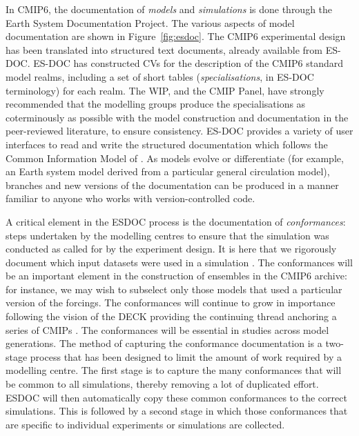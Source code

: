 \documentclass[gmd,manuscript]{copernicus}
\newcommand{\bibref}[1] { \cite{ref:#1}}
\newcommand{\figref}[1] {\mbox{Figure   \ref{fig:#1}}}
\begin{document}
In CMIP6, the documentation of \emph{models} and \emph{simulations} is
done through the Earth System Documentation
\citep[\href{https://goo.gl/WNwKD9}{ES-DOC},][]{ref:guilyardietal2013}
Project. The various aspects of model documentation are shown in
\figref{esdoc}. The CMIP6 experimental design has been translated into
structured text documents, already available from ES-DOC. ES-DOC has
constructed CVs for the description of the CMIP6 standard model
realms, including a set of short tables (\emph{specialisations}, in
ES-DOC terminology) for each realm. The WIP, and the CMIP Panel, have
strongly recommended that the modelling groups produce the
specialisations as coterminously as possible with the model
construction and documentation in the peer-reviewed literature, to
ensure consistency. ES-DOC provides a variety of user interfaces to
read and write the structured documentation which follows the Common
Information Model of \bibref{lawrenceetal2012}. As models evolve or
differentiate (for example, an Earth system model derived from a
particular general circulation model), branches and new versions of
the documentation can be produced in a manner familiar to anyone who
works with version-controlled code.

A critical element in the ESDOC process is the documentation of
\emph{conformances}: steps undertaken by the modelling centres to
ensure that the simulation was conducted as called for by the
experiment design. It is here that we rigorously document which input
datasets were used in a simulation \citep[e.g the version of each of
the forcing datasets, see][]{ref:duracketal2017}. The conformances
will be an important element in the construction of ensembles in the
CMIP6 archive: for instance, we may wish to subselect only those
models that used a particular version of the forcings. The
conformances will continue to grow in importance following the vision
of the DECK providing the continuing thread anchoring a series of
CMIPs \citep[viz. the well-known Figure~1 of][]{ref:eyringetal2016a}.
The conformances will be essential in studies across model
generations. The method of capturing the conformance documentation is
a two-stage process that has been designed to limit the amount of work
required by a modelling centre. The first stage is to capture the many
conformances that will be common to all simulations, thereby removing
a lot of duplicated effort. ESDOC will then automatically copy these
common conformances to the correct simulations. This is followed by a
second stage in which those conformances that are specific to
individual experiments or simulations are collected.
\end{document}
